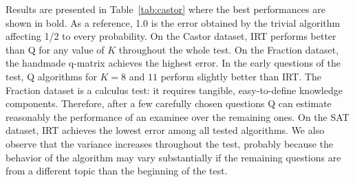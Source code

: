 \documentclass{edm_template}
\begin{document}


Results are presented in Table~\ref{tab:castor} where the best performances are shown in bold. As a reference, 1.0 is the error obtained by the trivial algorithm affecting 1/2 to every probability. On the Castor dataset, \textsf{IRT} performs better than \textsf{Q} for any value of $K$ throughout the whole test. On the Fraction dataset, the handmade q-matrix achieves the highest error. In the early questions of the test, \textsf{Q} algorithms for $K = 8$ and $11$ perform slightly better than \textsf{IRT}. The Fraction dataset is a calculus test: it requires tangible, easy-to-define knowledge components. Therefore, after a few carefully chosen questions \textsf{Q} can estimate reasonably the performance of an examinee over the remaining ones. On the SAT dataset, \textsf{IRT} achieves the lowest error among all tested algorithms. We also observe that the variance increases throughout the test, probably because the behavior of the algorithm may vary substantially if the remaining questions are from a different topic than the beginning of the test. %


\end{document}
